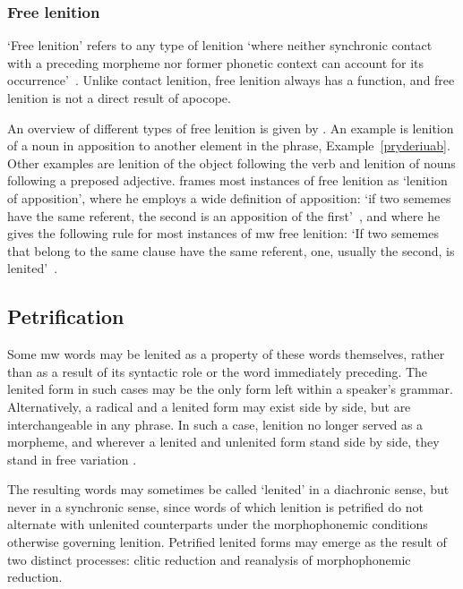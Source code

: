 \subsubsection{Free lenition}
\label{sec:free-lenition}
`Free lenition' refers to any type of lenition `where neither synchronic contact with a preceding morpheme nor former phonetic context can account for its occurrence'~\autocite[1]{schrijver_free_2010}. Unlike contact lenition, free lenition always has a function, and free lenition is not a direct result of apocope. 

An overview of different types of free lenition is given by \textcite{schrijver_free_2010}. An example is lenition of a noun in apposition to another element in the phrase, \eg Example~\ref{pryderiuab}.
Other examples are lenition of the object following the verb and lenition of nouns following a preposed adjective.
\Textcite{schrijver_free_2010} frames most instances of free lenition  as `lenition of apposition', where he employs a wide definition of apposition: `if two sememes have the same referent, the second is an apposition of the first'~\autocite[3]{schrijver_free_2010}, and where he gives the following rule for most instances of \gls{mw} free lenition: `If two sememes that belong to the same clause have the same referent, one, usually the second, is lenited'~\autocite[3]{schrijver_free_2010}.

\subsection{Petrification}
\label{sec:petrification}
Some \gls{mw} words may be lenited as a property of these words themselves, rather than as a result of its syntactic role or the word immediately preceding.
The lenited form in such cases may be the only form left within a speaker's grammar.
Alternatively, a radical and a lenited form may exist side by side, but are interchangeable in any phrase. In such a case, lenition no longer served as a morpheme, and wherever a lenited and unlenited form stand side by side, they stand in free variation \eg {}.

The resulting words may sometimes be called `lenited' in a diachronic sense, but never in a synchronic sense, since words of which lenition is petrified do not alternate with unlenited counterparts under the morphophonemic conditions otherwise governing lenition. Petrified lenited forms may emerge as the result of two distinct processes: clitic reduction and reanalysis of morphophonemic reduction.

